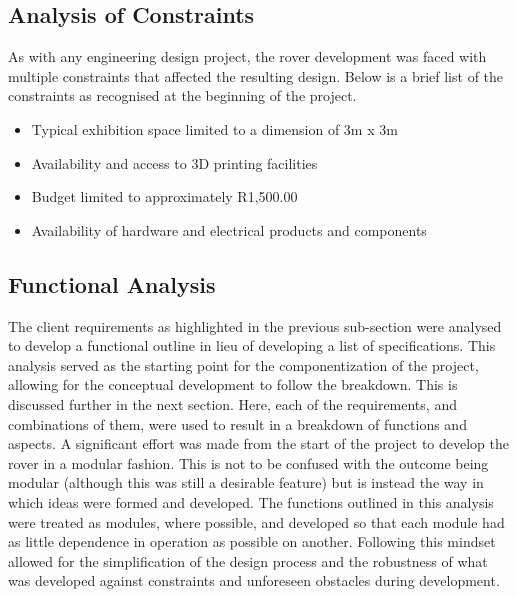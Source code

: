   \subsection{Analysis of Constraints}
    As with any engineering design project, the rover development was faced with multiple constraints that affected the resulting design. Below is a brief list of the constraints as recognised at the beginning of the project.
    
    \begin{itemize}
      \item Typical exhibition space limited to a dimension of 3m x 3m
      \item Availability and access to 3D printing facilities
      \item Budget limited to approximately R1,500.00
      \item Availability of hardware and electrical products and components
    \end{itemize}
    
  \subsection{Functional Analysis}
    The client requirements as highlighted in the previous sub-section were analysed to develop a functional outline in lieu of developing a list of specifications. This analysis served as the starting point for the componentization of the project, allowing for the conceptual development to follow the breakdown. This is discussed further in the next section. Here, each of the requirements, and combinations of them, were used to result in a breakdown of functions and aspects. A significant effort was made from the start of the project to develop the rover in a modular fashion. This is not to be confused with the outcome being modular (although this was still a desirable feature) but is instead the way in which ideas were formed and developed. The functions outlined in this analysis were treated as modules, where possible, and developed so that each module had as little dependence in operation as possible on another. Following this mindset allowed for the simplification of the design process and the robustness of what was developed against constraints and unforeseen obstacles during development.
    
